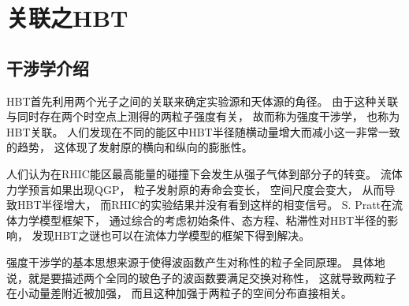 \chapter{关联之HBT}
\section{干涉学介绍}
HBT首先利用两个光子之间的关联来确定实验源和天体源的角径。%
由于这种关联与同时存在两个时空点上测得的两粒子强度有关，%
故而称为强度干涉学，%
也称为HBT关联。%
人们发现在不同的能区中HBT半径随横动量增大而减小这一非常一致的趋势，%
这体现了发射原的横向和纵向的膨胀性。%
\par
人们认为在RHIC能区最高能量的碰撞下会发生从强子气体到部分子的转变。%
流体力学预言如果出现QGP，%
粒子发射原的寿命会变长，%
空间尺度会变大，%
从而导致HBT半径增大，%
而RHIC的实验结果并没有看到这样的相变信号。%
S. Pratt在流体力学模型框架下，%
通过综合的考虑初始条件、态方程、粘滞性对HBT半径的影响，%
发现HBT之谜也可以在流体力学模型的框架下得到解决。%
\par
强度干涉学的基本思想来源于使得波函数产生对称性的粒子全同原理。%
具体地说，就是要描述两个全同的玻色子的波函数要满足交换对称性，%
这就导致两粒子在小动量差附近被加强，%
而且这种加强于两粒子的空间分布直接相关。%
{\color{red}{所以，可以利用两粒子动量空间的关联函数来得到坐标空间的信息。}}%

